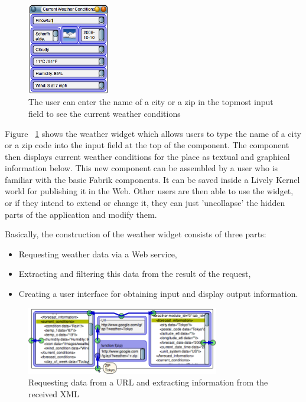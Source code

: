 \documentclass[pdftex, times, 10pt, twocolumn]{article}
\begin{document}
\begin{figure}[h]\centering
\includegraphics[width=0.320000\textwidth]{weatherExample03.png} 

\caption{The user can enter the name of a city or a zip in the topmost input field to see the current weather conditions }
\label{fig:WeatherExample}
\end{figure}
Figure ~\ref{fig:WeatherExample} shows the weather widget which allows users to type the name of a city or a zip code into the input field at the top of the component. The component then displays current weather conditions for the place as textual and graphical information below. This new component can be assembled  by a user who is familiar with the basic Fabrik components. It can be saved inside a Lively Kernel world for publishing it in the Web. Other users are then able to use the widget, or if they intend to extend or change it, they can just 'uncollapse' the hidden parts of the application and modify them. 

Basically, the construction of the weather widget consists of three parts: 


\begin{itemize}
  \item Requesting weather data via a Web service, 
  \item Extracting and filtering this data from the result of the request, 
  \item Creating a user interface for obtaining input and display output information. 
\end{itemize}


\begin{figure}[t]\centering
\includegraphics[width=0.750000\textwidth]{weatherExample09.png} 

\caption{Requesting data from a URL and extracting information from the received XML }
\label{fig:WebrequestInWeatherExample}
\end{figure}
\end{document}
